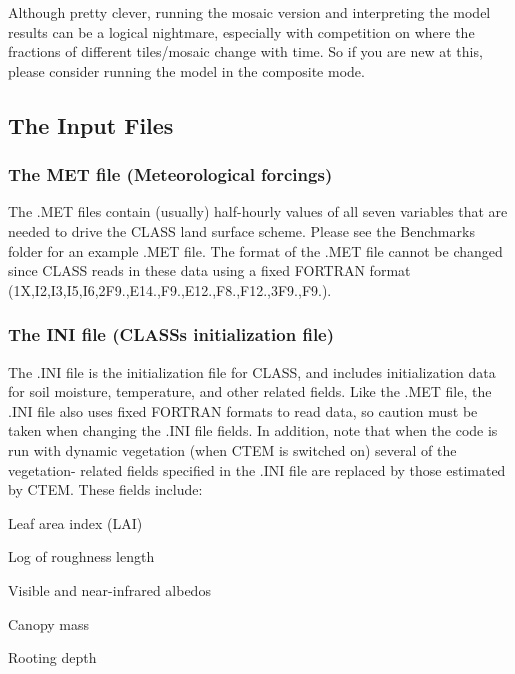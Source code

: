 Although pretty clever, running the mosaic version and interpreting the model results can be a logical nightmare, especially with competition on where the fractions of different tiles/mosaic change with time. So if you are new at this, please consider running the model in the composite mode.\hypertarget{index_inputs}{}\subsection{The Input Files}\label{index_inputs}
\hypertarget{index_MET}{}\subsubsection{The M\+E\+T file (\+Meteorological forcings)}\label{index_MET}
The .M\+E\+T files contain (usually) half-\/hourly values of all seven variables that are needed to drive the C\+L\+A\+S\+S land surface scheme. Please see the Benchmarks folder for an example .M\+E\+T file. The format of the .M\+E\+T file cannot be changed since C\+L\+A\+S\+S reads in these data using a fixed F\+O\+R\+T\+R\+A\+N format (1\+X,I2,I3,I5,I6,2\+F9.,E14.,F9.,E12.,F8.,F12.,3\+F9.,F9.).\hypertarget{index_INI}{}\subsubsection{The I\+N\+I file (\+C\+L\+A\+S\+S\textquotesingle{}s initialization file)}\label{index_INI}
The .I\+N\+I file is the initialization file for C\+L\+A\+S\+S, and includes initialization data for soil moisture, temperature, and other related fields. Like the .M\+E\+T file, the .I\+N\+I file also uses fixed F\+O\+R\+T\+R\+A\+N formats to read data, so caution must be taken when changing the .I\+N\+I file fields. In addition, note that when the code is run with dynamic vegetation (when C\+T\+E\+M is switched on) several of the vegetation-\/ related fields specified in the .I\+N\+I file are replaced by those estimated by C\+T\+E\+M. These fields include\+:


\begin{DoxyItemize}
\item Leaf area index (L\+A\+I)
\item Log of roughness length
\item Visible and near-\/infrared albedos
\item Canopy mass
\item Rooting depth
\end{DoxyItemize}

